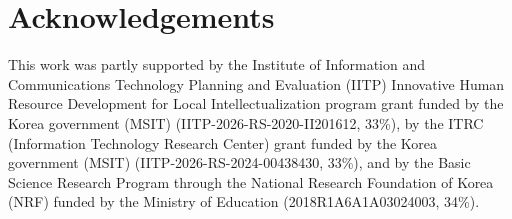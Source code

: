 \documentclass[preprint,12pt]{elsarticle}
\begin{document}
\section*{Acknowledgements}

This work was partly supported by the Institute of Information and Communications Technology Planning and Evaluation (IITP) Innovative Human Resource Development for Local Intellectualization program grant funded by the Korea government (MSIT) (IITP-2026-RS-2020-II201612, 33\%), by the ITRC (Information Technology Research Center) grant funded by the Korea government (MSIT) (IITP-2026-RS-2024-00438430, 33\%), and by the Basic Science Research Program through the National Research Foundation of Korea (NRF) funded by the Ministry of Education (2018R1A6A1A03024003, 34\%).
\end{document}

